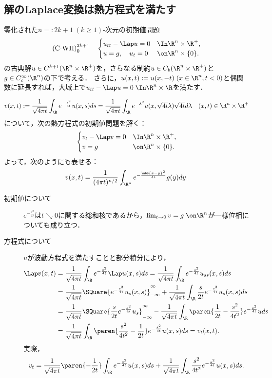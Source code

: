 \documentclass[uplatex,dvipdfmx]{jsreport}
\begin{document}
\subsection{解のLaplace変換は熱方程式を満たす}

\begin{problem}
    零化された$n=:2k+1\;(k\ge1)$-次元の初期値問題
    \[\text{(C-WH)}^{2k+1}_0\quad\begin{cases}
        u_{tt}-\Lap u=0&\In\R^n\times\R^+,\\
        u=g,\quad u_t=0&\on\R^n\times\{0\}.
    \end{cases}\]
    の古典解$u\in C^{k+1}(\R^n\times\R^+)$を，さらなる制約$u\in C_b(\R^n\times\R^+)$と$g\in C_c^\infty(\R^n)$の下で考える．
    さらに，$u(x,t):=u(x,-t)\;(x\in\R^n,t<0)$と偶関数に延長すれば，大域上で$u_{tt}-\Lap u=0\;\In\R^n\times\R$を満たす．
\end{problem}

\begin{proposition}[波動方程式の解のLaplace変換は熱方程式を解く]
    \[v(x,t):=\frac{1}{\sqrt{4\pi t}}\int_{\R}e^{-\frac{s^2}{4t}}u(x,s)ds=\frac{1}{\sqrt{4\pi t}}\int_\R e^{-\lambda^2}u(x,\sqrt{4t}\lambda)\sqrt{4t}d\lambda\quad(x,t)\in\R^n\times\R^+\]
    について，次の熱方程式の初期値問題を解く：
    \[\begin{cases}
        v_t-\Lap v=0&\In\R^n\times\R^+,\\
        v=g&\on\R^n\times\{0\}.
    \end{cases}\]
    よって，次のようにも表せる：
    \[v(x,t)=\frac{1}{(4\pi t)^{n/2}}\int_{\R^n}e^{-\frac{\abs{x-y}^2}{4t}}g(y)dy.\]
\end{proposition}
\begin{Proof}\mbox{}
    \begin{description}
        \item[初期値について] $e^{-\frac{s^2}{4t}}$は$t\searrow0$に関する総和核であるから，$\lim_{t\to0}v=g\;\on\R^n$が一様位相についても成り立つ．
        \item[方程式について] $u$が波動方程式を満たすことと部分積分により，
        \begin{align*}
            \Lap v(x,t)&=\frac{1}{\sqrt{4\pi t}}\int_\R e^{-\frac{s^2}{4t}}\Lap u(x,s)ds=\frac{1}{\sqrt{4\pi t}}\int_\R e^{-\frac{s^2}{4t}}u_{ss}(x,s)ds\\
            &=\frac{1}{\sqrt{4\pi t}}\SQuare{e^{-\frac{s^2}{4t}}u_s(x,s)}^\infty_{-\infty}+\frac{1}{\sqrt{4\pi t}}\int_\R \frac{s}{2t}e^{-\frac{s^2}{4t}}u_s(x,s)ds\\
            &=\frac{1}{\sqrt{4\pi t}}\SQuare{\frac{s}{2t}e^{-\frac{s^2}{4t}}u_s}^\infty_{-\infty}-\frac{1}{\sqrt{4\pi t}}\int_\R\paren{\frac{1}{2t}-\frac{s^2}{4t^2}}e^{-\frac{s^2}{4t}}uds\\
            &=\frac{1}{\sqrt{4\pi t}}\int_\R \paren{\frac{s^2}{4t^2}-\frac{1}{2t}}e^{-\frac{s^2}{4t}}u(x,s)ds=v_t(x,t).
        \end{align*}
        実際，
        \[v_t=\frac{1}{\sqrt{4\pi t}}\paren{-\frac{1}{2t}}\int_\R e^{-\frac{s^2}{4t}}u(x,s)ds+\frac{1}{\sqrt{4\pi t}}\int_\R\frac{s^2}{4t^2}e^{-\frac{s^2}{4t}}u(x,s)ds.\]
    \end{description}
\end{Proof}
\end{document}
